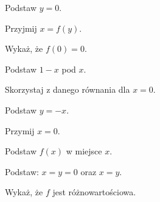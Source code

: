 
\begin{hints_list}
	\item Podstaw $y = 0$.
	\item Przyjmij $x = f(y)$.
	\item Wykaż, że $f(0) = 0$.
	\item Podstaw $1 - x$ pod $x$.
	\item Skorzystaj z danego równania dla $x = 0$.
	\item Podstaw $y = -x$.
	\item Przymij $x = 0$.
	\item Podstaw $f(x)$ w miejsce $x$.
	\item Podstaw: $x = y = 0$ oraz $x = y$.
	\item Wykaż, że $f$ jest różnowartościowa.
\end{hints_list}